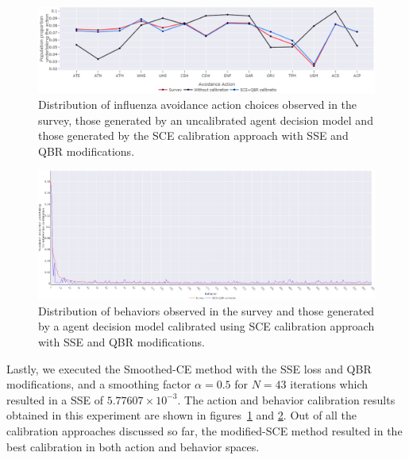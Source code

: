 \documentclass[doublespace]{VTthesis}
\begin{document}
    \begin{figure}
    \centering
    \includegraphics[width=\textwidth]{figures/qbr-marginals.png}
    \caption{Distribution of influenza avoidance action choices observed in the survey, those generated by an uncalibrated agent decision model and those generated by the SCE calibration approach with SSE and QBR modifications.}
    \label{fig:qbr-marginals}
    \end{figure}
    \begin{figure}
    \centering
    \includegraphics[width=\textwidth]{figures/qbr-joints.png}
    \caption{Distribution of behaviors observed in the survey and those generated by a agent decision model calibrated using SCE calibration approach with SSE and QBR modifications.}
    \label{fig:qbr-joints}
    \end{figure}
    
    Lastly, we executed the Smoothed-CE method with the SSE loss and QBR modifications, and a smoothing factor $\alpha = 0.5$ for $N=43$ iterations which resulted in a SSE of $5.77607 \times 10^{-3}$. The action and behavior calibration results obtained in this experiment are shown in figures~\ref{fig:qbr-marginals} and \ref{fig:qbr-joints}. Out of all the calibration approaches discussed so far, the modified-SCE method resulted in the best calibration in both action and behavior spaces.
    
\end{document}
